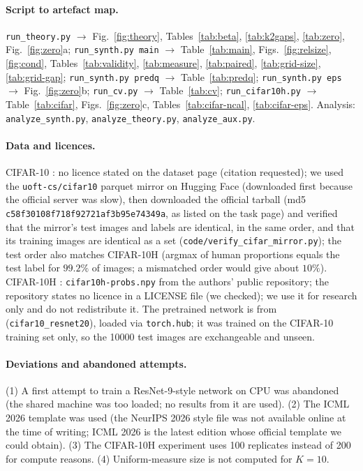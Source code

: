 \paragraph{Script to artefact map.}
\texttt{run\_theory.py} $\to$ Fig.~\ref{fig:theory}, Tables~\ref{tab:beta}, \ref{tab:k2gaps}, \ref{tab:zero}, Fig.~\ref{fig:zero}a; \texttt{run\_synth.py main} $\to$ Table~\ref{tab:main}, Figs.~\ref{fig:relsize}, \ref{fig:cond}, Tables~\ref{tab:validity}, \ref{tab:measure}, \ref{tab:paired}, \ref{tab:grid-size}, \ref{tab:grid-gap}; \texttt{run\_synth.py predq} $\to$ Table~\ref{tab:predq}; \texttt{run\_synth.py eps} $\to$ Fig.~\ref{fig:zero}b; \texttt{run\_cv.py} $\to$ Table~\ref{tab:cv}; \texttt{run\_cifar10h.py} $\to$ Table~\ref{tab:cifar}, Figs.~\ref{fig:zero}c, Tables~\ref{tab:cifar-ncal}, \ref{tab:cifar-eps}. Analysis: \texttt{analyze\_synth.py}, \texttt{analyze\_theory.py}, \texttt{analyze\_aux.py}.

\paragraph{Data and licences.} CIFAR-10 \citep{krizhevsky2009}: no licence stated on the dataset page (citation requested); we used the \texttt{uoft-cs/cifar10} parquet mirror on Hugging Face (downloaded first because the official server was slow), then downloaded the official tarball (md5 \texttt{c58f30108f718f92721af3b95e74349a}, as listed on the task page) and verified that the mirror's test images and labels are identical, in the same order, and that its training images are identical as a set (\texttt{code/verify\_cifar\_mirror.py}); the test order also matches CIFAR-10H (argmax of human proportions equals the test label for $99.2\%$ of images; a mismatched order would give about $10\%$). CIFAR-10H \citep{peterson2019cifar10h}: \texttt{cifar10h-probs.npy} from the authors' public repository; the repository states no licence in a LICENSE file (we checked); we use it for research only and do not redistribute it. The pretrained network is from \citet{chenyaofo2021cifar} (\texttt{cifar10\_resnet20}), loaded via \texttt{torch.hub}; it was trained on the CIFAR-10 training set only, so the 10000 test images are exchangeable and unseen.

\paragraph{Deviations and abandoned attempts.} (1) A first attempt to train a ResNet-9-style network on CPU was abandoned (the shared machine was too loaded; no results from it are used). (2) The ICML 2026 template was used (the NeurIPS 2026 style file was not available online at the time of writing; ICML 2026 is the latest edition whose official template we could obtain). (3) The CIFAR-10H experiment uses 100 replicates instead of 200 for compute reasons. (4) Uniform-measure size is not computed for $K=10$.

